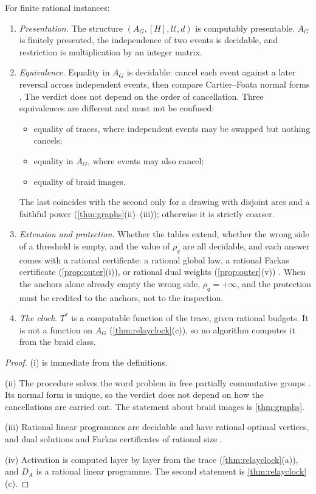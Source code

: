 \documentclass[11pt]{article}
\theoremstyle{definition}\newtheorem{definition}[theorem]{Definition}\newtheorem{remark}[theorem]{Remark}\newtheorem{example}[theorem]{Example}\newtheorem{problem}[theorem]{Open problem}\crefname{problem}{Problem}{Problems}
\begin{document}
\begin{proposition}\label{prop:effective}
For finite rational instances:
\begin{enumerate}
\item[(i)] \emph{Presentation.} The structure $(A_G,[H],\mathcal U,d)$ is computably presentable. $A_G$ is finitely presented, the independence of two events is decidable, and restriction is multiplication by an integer matrix.
\item[(ii)] \emph{Equivalence.} Equality in $A_G$ is decidable: cancel each event against a later reversal across independent events, then compare Cartier--Foata normal forms \cite{Wrathall1988,CartierFoata1969}. The verdict does not depend on the order of cancellation. Three equivalences are different and must not be confused:
\begin{itemize}
\item equality of traces, where independent events may be swapped but nothing cancels;
\item equality in $A_G$, where events may also cancel;
\item equality of braid images.
\end{itemize}
The last coincides with the second only for a drawing with disjoint arcs and a faithful power (\cref{thm:graphs}(ii)--(iii)); otherwise it is strictly coarser.
\item[(iii)] \emph{Extension and protection.} Whether the tables extend, whether the wrong side of a threshold is empty, and the value of $\rho_q$ are all decidable, and each answer comes with a rational certificate: a rational global law, a rational Farkas certificate (\cref{prop:outer}(i)), or rational dual weights (\cref{prop:outer}(v)) \cite{Schrijver1986}. When the anchors alone already empty the wrong side, $\rho_q=+\infty$, and the protection must be credited to the anchors, not to the inspection.
\item[(iv)] \emph{The clock.} $T^\ast$ is a computable function of the trace, given rational budgets. It is not a function on $A_G$ (\cref{thm:relayclock}(c)), so no algorithm computes it from the braid class.
\end{enumerate}
\end{proposition}

\begin{proof}
(i) is immediate from the definitions.

(ii) The procedure solves the word problem in free partially commutative groups \cite{Wrathall1988}. Its normal form is unique, so the verdict does not depend on how the cancellations are carried out. The statement about braid images is \cref{thm:graphs}.

(iii) Rational linear programmes are decidable and have rational optimal vertices, and dual solutions and Farkas certificates of rational size \cite{Schrijver1986}.

(iv) Activation is computed layer by layer from the trace (\cref{thm:relayclock}(a)), and $D_A$ is a rational linear programme. The second statement is \cref{thm:relayclock}(c).
\end{proof}
\end{document}
